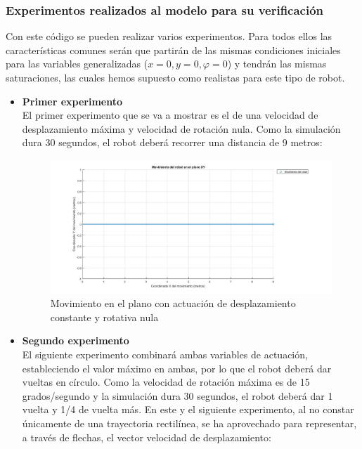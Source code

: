 \documentclass[a4paper,twoside]{article}
\begin{document}
\subsubsection{Experimentos realizados al modelo para su verificación}
Con este código se pueden realizar varios experimentos. Para todos ellos las características comunes serán que partirán de las mismas condiciones iniciales para las variables generalizadas ($x=0, y=0, \varphi=0$) y tendrán las mismas saturaciones, las cuales hemos supuesto como realistas para este tipo de robot.\\
	\begin{itemize}

		\item \textbf{Primer experimento} \\
	El primer experimento que se va a mostrar es el de una velocidad de desplazamiento máxima y velocidad de rotación nula. Como la simulación dura 30 segundos, el robot deberá recorrer una distancia de 9 metros:

	\begin{figure}[h!]
		\centering
		\includegraphics[width=1\textwidth]{exp_MCD_1}
		\caption{Movimiento en el plano con actuación de desplazamiento constante y rotativa nula}
	\end{figure}

\newpage
	\item \textbf{Segundo experimento} \\
	El siguiente experimento combinará ambas variables de actuación, estableciendo el valor máximo en ambas, por lo que el robot deberá dar vueltas en círculo. Como la velocidad de rotación máxima es de 15 grados/segundo y la simulación dura 30 segundos, el robot deberá dar 1 vuelta y 1/4 de vuelta más. En este y el siguiente experimento, al no constar únicamente de una trayectoria rectilínea, se ha aprovechado para representar, a través de flechas, el vector velocidad de desplazamiento:


\end{itemize}
\end{document}
